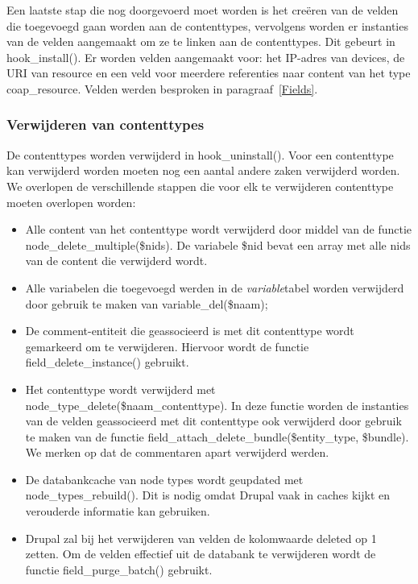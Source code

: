 \noindent
Een laatste stap die nog doorgevoerd moet worden is het cre\"{e}ren van de velden die toegevoegd gaan worden aan de contenttypes, vervolgens worden er instanties van de velden aangemaakt om ze te linken aan de contenttypes. Dit gebeurt in hook\_install(). Er worden velden aangemaakt voor: het IP-adres van devices, de URI van resource en een veld voor meerdere referenties naar content van het type coap\_resource. Velden werden besproken in paragraaf~\ref{Fields}.

\subsubsection{Verwijderen van contenttypes}
De contenttypes worden verwijderd in hook\_uninstall(). Voor een contenttype kan verwijderd worden moeten nog een aantal andere zaken verwijderd worden. We overlopen de verschillende stappen die voor elk te verwijderen contenttype moeten overlopen worden:
\begin{itemize}
\item Alle content van het contenttype wordt verwijderd door middel van de functie\\ node\_delete\_multiple(\$nids). De variabele \$nid bevat een array met alle nids van de content die verwijderd wordt.
\item Alle variabelen die toegevoegd werden in de \textit{variable}tabel worden verwijderd door gebruik te maken van variable\_del(\$naam);
\item De comment-entiteit die geassocieerd is met dit contenttype wordt gemarkeerd om te verwijderen. Hiervoor wordt de functie field\_delete\_instance() gebruikt.
\item Het contenttype wordt verwijderd met node\_type\_delete(\$naam\_contenttype). In deze functie worden de instanties van de velden geassocieerd met dit contenttype ook verwijderd door gebruik te maken van de functie field\_attach\_delete\_bundle(\$entity\_type, \$bundle). We merken op dat de commentaren apart verwijderd werden.
\item De databankcache van node types wordt geupdated met node\_types\_rebuild(). Dit is nodig omdat Drupal vaak in caches kijkt en verouderde informatie kan gebruiken.
\item Drupal zal bij het verwijderen van velden de kolomwaarde deleted op 1 zetten. Om de velden effectief uit de databank te verwijderen wordt de functie field\_purge\_batch() gebruikt.
\end{itemize}

